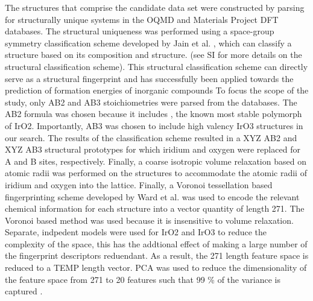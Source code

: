 The structures that comprise the candidate data set were constructed by parsing for structurally unique systems in the OQMD and Materials Project DFT databases.
%
The structural uniqueness was performed using a space-group symmetry classification scheme developed by Jain et al. \cite{Jain2018},
which can classify a structure based on its composition and structure.
 (see SI for more details on the structural classification scheme).
%
This structural classification scheme can directly serve as a structural fingerprint and has successfully been applied towards the prediction of formation energies of inorganic compounds \cite{Jain2018}
%
To focus the scope of the study, only AB2 and AB3 stoichiometries were parsed from the databases.
%
The AB2 formula was chosen because it includes \rIrOtwo, the known most stable polymorph of IrO2.
%
Importantly, AB3 was chosen to include high valency IrO3 structures in our search.
%
The results of the classification scheme resulted in a XYZ AB2 and XYZ AB3 structural prototypes for which iridium and oxygen were replaced for A and B sites, respectively.
%
Finally, a coarse isotropic volume relaxation based on atomic radii was performed on the structures to accommodate the atomic radii of iridium and oxygen into the lattice.
%
Finally, a Voronoi tessellation based fingerprinting scheme developed by Ward et al. \cite{Ward2017} was used to encode the relevant chemical information for each structure into a vector quantity of length 271.
%
The Voronoi based method was used because it is insensitive to volume relaxation.
%
Separate, indpedent models were used for IrO2 and IrO3 to reduce the complexity of the space, this has the addtional effect of making a large number of the fingerprint descriptors reduendant.
As a result, the 271 length feature space is reduced to a TEMP length vector.
%
PCA was used to reduce the dimensionality of the feature space from 271 to 20 features such that 99 \% of the variance is captured \cite{Tipping1999}.



